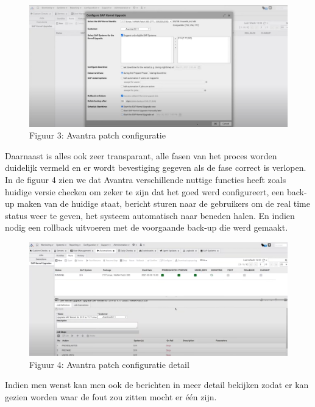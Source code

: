 \documentclass[dutch,dit,thesis]{hogentreport}
\begin{document}
\begin{figure}[htbp]
    \centering
    \includegraphics[width=\textwidth]{avantra1.png}
    \caption{Figuur 3: Avantra patch configuratie }
     \label{fig:avantra1}
\end{figure}




Daarnaast is alles ook zeer transparant, alle fasen van het proces worden duidelijk vermeld en er wordt bevestiging gegeven als de fase correct is verlopen. In de figuur 4 zien we dat Avantra verschillende
nuttige functies heeft zoals huidige versie checken om zeker te zijn dat het goed werd configureert, een back-up maken van de huidige staat, bericht sturen naar de gebruikers om de real time status weer
   te geven, het systeem automatisch naar beneden halen. En indien nodig een rollback uitvoeren met de voorgaande back-up die werd gemaakt.

\begin{figure}[htbp]
    \centering
    \includegraphics[width=\textwidth]{avantra2.png}
    \caption{Figuur 4: Avantra patch configuratie detail}
     \label{fig:avantra2}
\end{figure}



Indien men wenst kan men ook de berichten in meer detail bekijken zodat er kan gezien worden waar de fout zou zitten mocht er één zijn.
\end{document}

